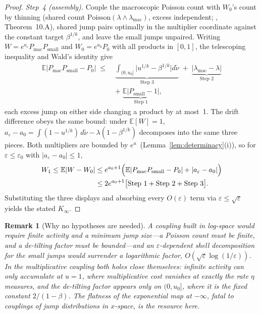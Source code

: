\documentclass[pdflatex,sn-mathphys-num]{sn-jnl}
\theoremstyle{thmstyleone}
\theoremstyle{thmstyletwo}
\newtheorem*{remark}{Remark}
\theoremstyle{thmstylethree}
\begin{document}
\begin{proof}
\textit{Step~4 (assembly).}  Couple the macroscopic Poisson count
with $W_0$'s count by thinning (shared count
$\mathrm{Poisson}(\lambda\wedge\lambda_{\mathrm{mac}})$, excess
independent; \cite{BHJ92}, Theorem~10.A), shared jump pairs
optimally in the multiplier coordinate against the constant target
$\beta^{1/k}$, and leave the small jumps unpaired.  Writing $W =
e^{a_\varepsilon}P_{\mathrm{mac}}P_{\mathrm{small}}$ and $W_0 =
e^{a_0}P_0$ with all products in $[0,1]$, the telescoping inequality
and Wald's identity give
\[
\begin{aligned}
  \mathbb{E}\bigl|P_{\mathrm{mac}}P_{\mathrm{small}} - P_0\bigr|
  \;\le\;
  &\underbrace{\int_{(0,u_0]}\!\bigl|u^{1/k}-\beta^{1/k}\bigr|
  d\tilde\nu}_{\text{Step 3}}
  \;+\;
  \underbrace{\bigl|\lambda_{\mathrm{mac}} -
  \lambda\bigr|}_{\text{Step 2}}\\
  &+\;
  \underbrace{\mathbb{E}\bigl|P_{\mathrm{small}} -
  1\bigr|}_{\text{Step 1}},
\end{aligned}
\]
each excess jump on either side changing a product by at most~1.
The drift difference obeys the same bound: under $\mathbb{E}[W]=1$,
$a_\varepsilon - a_0 = \int(1-u^{1/k})\,d\tilde\nu -
\lambda(1-\beta^{1/k})$ decomposes into the same three pieces.  Both
multipliers are bounded by $e^{a_\cdot}$
(Lemma~\ref{lem:determinacy}(i)), so for $\varepsilon \le
\varepsilon_0$ with $|a_\varepsilon - a_0| \le 1$,
\[
\begin{aligned}
  W_1 \le \mathbb{E}|W - W_0|
  &\le e^{a_0+1}\Bigl(\mathbb{E}|P_{\mathrm{mac}}P_{\mathrm{small}}
  - P_0| + |a_\varepsilon - a_0|\Bigr)\\
  &\le 2e^{a_0+1}\bigl[\text{Step 1} + \text{Step 2} +
  \text{Step 3}\bigr].
\end{aligned}
\]
Substituting the three displays and absorbing every
$O(\varepsilon)$ term via $\varepsilon \le \sqrt\varepsilon$ yields
the stated $K_\infty$.
\end{proof}

\begin{remark}[Why no hypotheses are needed]
A coupling built in log-space would require finite activity and a
minimum jump size---a Poisson count must be finite, and a de-tilting
factor must be bounded---and an $\varepsilon$-dependent shell
decomposition for the small jumps would surrender a logarithmic
factor, $O(\sqrt\varepsilon\log(1/\varepsilon))$.  In the
multiplicative coupling both holes close themselves: infinite
activity can only accumulate at $u = 1$, where multiplicative cost
vanishes at exactly the rate $\eta$ measures, and the de-tilting
factor appears only on $(0,u_0]$, where it is the fixed constant
$2/(1-\beta)$.  The flatness of the exponential map at $-\infty$,
fatal to couplings of jump distributions in $x$-space, is the
resource here.
\end{remark}
\end{document}

